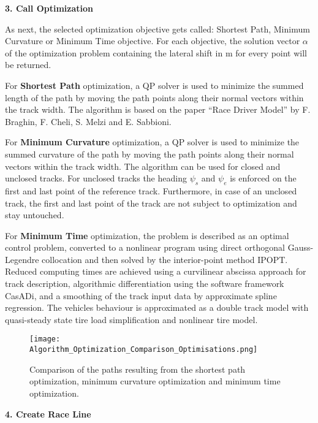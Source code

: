 \textbf{3. Call Optimization}

As next, the selected optimization objective gets called: Shortest Path, Minimum Curvature or Minimum Time objective. For each objective, the solution vector $\alpha$ of the optimization problem containing the lateral shift in m for every point will be returned.

For \textbf{Shortest Path} optimization, a QP solver is used to minimize the summed length of the path by moving the path points along their normal vectors within the track width. The algorithm is based on the paper ``Race Driver Model'' by F. Braghin, F. Cheli, S. Melzi and E. Sabbioni. \cite{shortest_path}

For \textbf{Minimum Curvature} optimization, a QP solver is used to minimize the summed curvature of the path by moving the path points along their normal vectors within the track width. The algorithm can be used for closed and unclosed tracks. For unclosed tracks the heading $\psi_s$ and $\psi_e$ is enforced on the first and last point of the reference track. Furthermore, in case of an unclosed track, the first and last point of the track are not subject to optimization and stay untouched. \cite{minimum_curvature_trajectory_planning}

For \textbf{Minimum Time} optimization, the problem is described as an optimal control problem, converted to a nonlinear program using direct orthogonal Gauss-Legendre collocation and then solved by the interior-point method IPOPT. Reduced computing
times are achieved using a curvilinear abscissa approach for track description, algorithmic differentiation using the software framework CasADi, and a smoothing of the track input data by approximate spline regression. The vehicles behaviour is approximated as a double track model with quasi-steady state tire load simplification and nonlinear tire model. \cite{minimum_time_trajectory_planning} \cite{powertrain_behaviour}

\begin{figure}[H]
    \centering
    \texttt{[image: Algorithm\_Optimization\_Comparison\_Optimisations.png]}
    \caption{Comparison of the paths resulting from the shortest path optimization, minimum curvature optimization and minimum time optimization. \cite{minimum_curvature_trajectory_planning}}
    \label{fig:Optimization Algorithm Comparing Different Optimisations}
\end{figure}

\textbf{4. Create Race Line}

